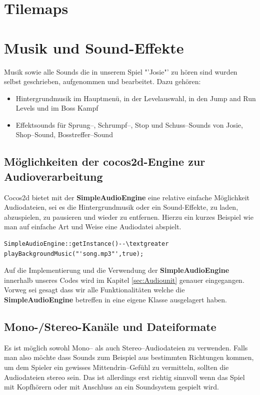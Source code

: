 \section{Tilemaps}

\section{Musik und Sound-Effekte}

Musik sowie alle Sounds die in unserem Spiel "'Josie"' zu hören sind wurden selbst geschrieben, aufgenommen und bearbeitet. Dazu gehören:

\begin{itemize}
\item Hintergrundmusik im Hauptmenü, in der Levelauswahl, in den Jump and Run Levels und im Boss Kampf
\item Effektsounds für Sprung--, Schrumpf--, Stop und Schuss--Sounds von Josie, Shop--Sound, Bosstreffer--Sound
\end{itemize}

\subsection{Möglichkeiten der cocos2d-Engine zur Audioverarbeitung}
Cocos2d bietet mit der \textbf{SimpleAudioEngine} eine relative einfache Möglichkeit Audio\-dateien, sei es die Hintergrundmusik oder ein Sound-Effekte, zu laden, abzuspielen, zu pausieren und wieder zu entfernen. Hierzu ein kurzes Beispiel wie man auf einfache Art und Weise eine Audiodatei abspielt.

\begin{lstlisting}[style=singleline]
SimpleAudioEngine::getInstance()--\textgreater playBackgroundMusic("'song.mp3"',true);
\end{lstlisting}

Auf die Implementierung und die Verwendung der \textbf{SimpleAudioEngine} innerhalb unseres Codes wird im Kapitel \ref{sec:Audiounit} genauer eingegangen. Vorweg sei gesagt dass wir alle Funktionalitäten welche die \textbf{SimpleAudioEngine} betreffen in eine eigene Klasse  ausgelagert haben.

\subsection{Mono-/Stereo-Kanäle und Dateiformate}
Es ist möglich sowohl Mono-- als auch Stereo--Audiodateien zu verwenden. Falls man also möchte dass Sounds zum Beispiel aus bestimmten Richtungen kommen, um dem Spieler ein gewisses Mittendrin--Gefühl zu vermitteln, sollten die Audiodateien stereo sein. Das ist allerdings erst richtig sinnvoll wenn das Spiel mit Kopfhörern oder mit Anschluss an ein Soundsystem gespielt wird. 

